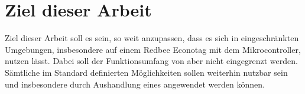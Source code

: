 \section{Ziel dieser Arbeit}
Ziel dieser Arbeit soll es sein,  so weit anzupassen, dass es sich in eingeschränkten Umgebungen, insbesondere auf einem Redbee Econotag \cite{econotag} mit dem
 \cite{mc1322} Mikrocontroller, nutzen lässt. Dabei soll der Funktionsumfang von  aber nicht eingegrenzt werden. Sämtliche im Standard
definierten Möglichkeiten sollen weiterhin nutzbar sein und insbesondere durch Aushandlung eines  angewendet werden können.